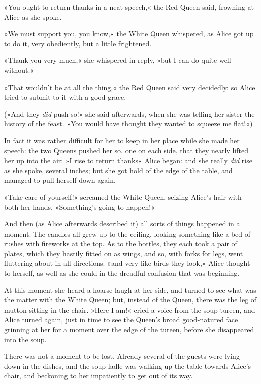 »You ought to return thanks in a neat speech,« the Red Queen said, frowning at Alice as she spoke.

»We must support you, you know,« the White Queen whispered, as Alice got up to do it, very obediently, but a little frightened.

»Thank you very much,« she whispered in reply, »but I can do quite well without.«

»That wouldn't be at all the thing,« the Red Queen said very decidedly: so Alice tried to submit to it with a good grace.

(»And they \textit{did} push so!« she said afterwards, when she was telling her sister the history of the feast. »You would have thought they wanted to squeeze me flat!«)

In fact it was rather difficult for her to keep in her place while she made her speech: the two Queens pushed her so, one on each side, that they nearly lifted her up into the air: »I rise to return thanks\longdash« Alice began: and she really \textit{did} rise as she spoke, several inches; but she got hold of the edge of the table, and managed to pull herself down again.

»Take care of yourself!« screamed the White Queen, seizing Alice's hair with both her hands. »Something's going to happen!«

And then (as Alice afterwards described it) all sorts of things happened in a moment. The candles all grew up to the ceiling, looking something like a bed of rushes with fireworks at the top. As to the bottles, they each took a pair of plates, which they hastily fitted on as wings, and so, with forks for legs, went fluttering about in all directions: »and very like birds they look,« Alice thought to herself, as well as she could in the dreadful confusion that was beginning.

At this moment she heard a hoarse laugh at her side, and turned to see what was the matter with the White Queen; but, instead of the Queen, there was the leg of mutton sitting in the chair. »Here I am!« cried a voice from the soup tureen, and Alice turned again, just in time to see the Queen's broad good-natured face grinning at her for a moment over the edge of the tureen, before she disappeared into the soup.

\label{black10}

There was not a moment to be lost. Already several of the guests were lying down in the dishes, and the soup ladle was walking up the table towards Alice's chair, and beckoning to her impatiently to get out of its way.

